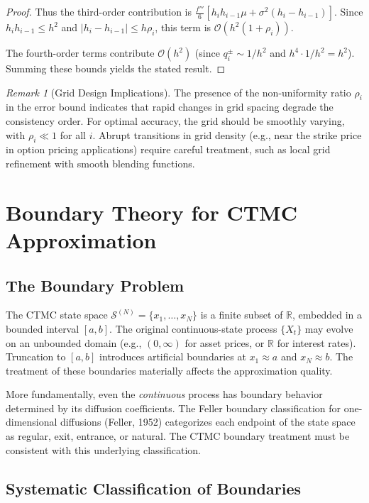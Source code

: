 \documentclass[11pt,a4paper,openany]{book}
\theoremstyle{definition}
\theoremstyle{plain}
\theoremstyle{remark}
\newtheorem{remark}[theorem]{Remark}
\newcommand{\1}{\mathbbm{1}}
\newcommand{\R}{\mathbb{R}}
\newcommand{\calS}{\mathcal{S}}
\begin{document}
\begin{proof}
Thus the third-order contribution is $\frac{f'''}{6} [h_{i} h_{i-1} \mu + \sigma^{2} (h_{i} - h_{i-1})]$. Since $h_{i} h_{i-1} \leq h^{2}$ and $|h_{i} - h_{i-1}| \leq h \rho_{i}$, this term is $\mathcal{O}(h^{2}(1 + \rho_{i}))$.

The fourth-order terms contribute $\mathcal{O}(h^{2})$ (since $q_{i}^{\pm} \sim 1/h^{2}$ and $h^{4} \cdot 1/h^{2} = h^{2}$). Summing these bounds yields the stated result.
\end{proof}

\begin{remark}[Grid Design Implications]
The presence of the non-uniformity ratio $\rho_{i}$ in the error bound indicates that rapid changes in grid spacing degrade the consistency order. For optimal accuracy, the grid should be smoothly varying, with $\rho_{i} \ll 1$ for all $i$. Abrupt transitions in grid density (e.g., near the strike price in option pricing applications) require careful treatment, such as local grid refinement with smooth blending functions.
\end{remark}

\chapter{Boundary Theory for CTMC Approximation}
\label{ch:boundary}

\section{The Boundary Problem}

The CTMC state space $\calS^{(N)} = \{x_{1}, \ldots, x_{N}\}$ is a finite subset of $\R$, embedded in a bounded interval $[a, b]$. The original continuous-state process $\{X_{t}\}$ may evolve on an unbounded domain (e.g., $(0, \infty)$ for asset prices, or $\R$ for interest rates). Truncation to $[a,b]$ introduces artificial boundaries at $x_{1} \approx a$ and $x_{N} \approx b$. The treatment of these boundaries materially affects the approximation quality.

More fundamentally, even the \emph{continuous} process has boundary behavior determined by its diffusion coefficients. The Feller boundary classification for one-dimensional diffusions (Feller, 1952) categorizes each endpoint of the state space as regular, exit, entrance, or natural. The CTMC boundary treatment must be consistent with this underlying classification.

\section{Systematic Classification of Boundaries}
\end{document}
